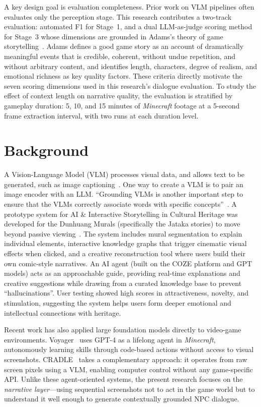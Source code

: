 \documentclass{article}
\begin{document}
A key design goal is evaluation completeness. Prior work on VLM pipelines often evaluates only the perception stage. This research contributes a two-track evaluation: automated F1 for Stage~1, and a dual LLM-as-judge scoring method~\cite{Zheng2023} for Stage~3 whose dimensions are grounded in Adams's theory of game storytelling~\cite{Adams2014}. Adams defines a good game story as an account of dramatically meaningful events that is credible, coherent, without undue repetition, and without arbitrary content, and identifies length, characters, degree of realism, and emotional richness as key quality factors. These criteria directly motivate the seven scoring dimensions used in this research's dialogue evaluation. To study the effect of context length on narrative quality, the evaluation is stratified by gameplay duration: 5, 10, and 15 minutes of \emph{Minecraft} footage at a 5-second frame extraction interval, with two runs at each duration level.

\section{Background}

A Vision-Language Model (VLM) processes visual data, and allows text to be generated,
such as image captioning~\cite{bordes2024introductionvisionlanguagemodeling}.
One way to create a VLM is to pair an image encoder with an LLM.
``Grounding VLMs is another important step to ensure
that the VLMs correctly associate words with specific concepts''~\cite{bordes2024introductionvisionlanguagemodeling}.
A prototype system for AI \& Interactive Storytelling in Cultural Heritage was developed for the Dunhuang Murals (specifically the Jataka stories) to move beyond passive viewing~\cite{11227644}. The system includes mural segmentation to explain individual elements, interactive knowledge graphs that trigger cinematic visual effects when clicked, and a creative reconstruction tool where users build their own comic-style narratives. An AI agent (built on the COZE platform and GPT models) acts as an approachable guide, providing real-time explanations and creative suggestions while drawing from a curated knowledge base to prevent ``hallucinations''. User testing showed high scores in attractiveness, novelty, and stimulation, suggesting the system helps users form deeper emotional and intellectual connections with heritage.

Recent work has also applied large foundation models directly to video-game environments. Voyager~\cite{Wang2023Voyager} uses GPT-4 as a lifelong agent in \emph{Minecraft}, autonomously learning skills through code-based actions without access to visual screenshots. CRADLE~\cite{Tan2024CRADLE} takes a complementary approach: it operates from raw screen pixels using a VLM, enabling computer control without any game-specific API. Unlike these agent-oriented systems, the present research focuses on the \emph{narrative layer}---using sequential screenshots not to act in the game world but to understand it well enough to generate contextually grounded NPC dialogue.
\end{document}
